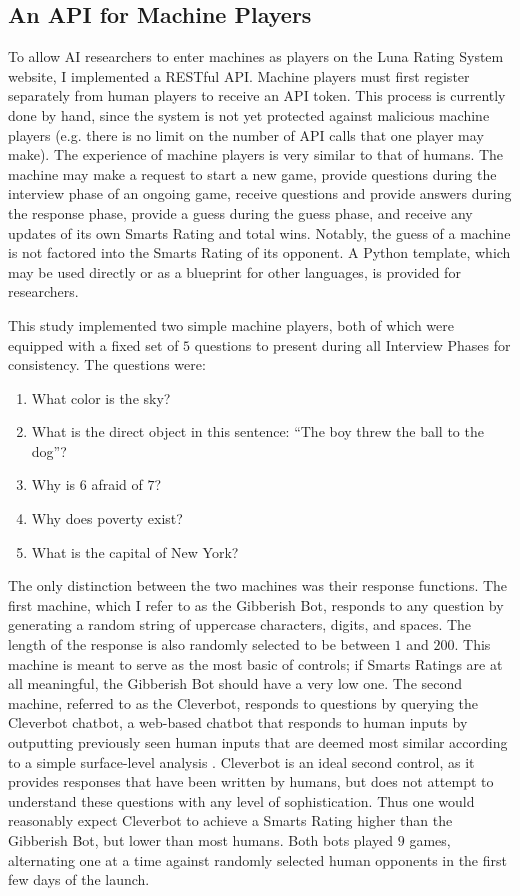 \subsection{An API for Machine Players}

To allow AI researchers to enter machines as players on the Luna Rating System website, I implemented a RESTful API. Machine players must first register separately from human players to receive an API token. This process is currently done by hand, since the system is not yet protected against malicious machine players (e.g. there is no limit on the number of API calls that one player may make). The experience of machine players is very similar to that of humans. The machine may make a request to start a new game, provide questions during the interview phase of an ongoing game, receive questions and provide answers during the response phase, provide a guess during the guess phase, and receive any updates of its own Smarts Rating and total wins. Notably, the guess of a machine is not factored into the Smarts Rating of its opponent. A Python template, which may be used directly or as a blueprint for other languages, is provided for researchers. 


This study implemented two simple machine players, both of which were equipped with a fixed set of $5$ questions to present during all Interview Phases for consistency. The questions were:

\begin{enumerate}
\item What color is the sky?
\item What is the direct object in this sentence: ``The boy threw the ball to the dog''? 
\item Why is $6$ afraid of $7$?
\item Why does poverty exist?
\item What is the capital of New York?
\end{enumerate}

The only distinction between the two machines was their response functions. The first machine, which I refer to as the Gibberish Bot, responds to any question by generating a random string of uppercase characters, digits, and spaces. The length of the response is also randomly selected to be between $1$ and $200$. This machine is meant to serve as the most basic of controls; if Smarts Ratings are at all meaningful, the Gibberish Bot should have a very low one. The second machine, referred to as the Cleverbot, responds to questions by querying the Cleverbot chatbot, a web-based chatbot that responds to human inputs by outputting previously seen human inputs that are deemed most similar according to a simple surface-level analysis  \citep{carpenter2015cleverbot}. Cleverbot is an ideal second control, as it provides responses that have been written by humans, but does not attempt to understand these questions with any level of sophistication. Thus one would reasonably expect Cleverbot to achieve a Smarts Rating higher than the Gibberish Bot, but lower than most humans. Both bots played $9$ games, alternating one at a time against randomly selected human opponents in the first few days of the launch.


